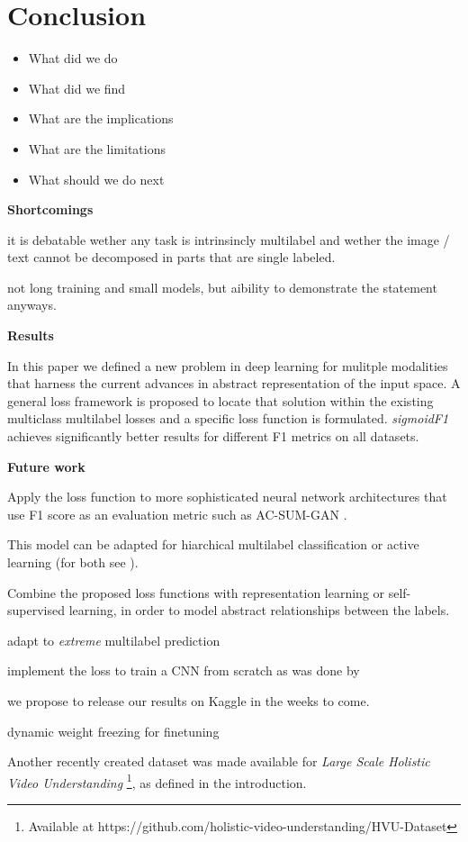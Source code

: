 
\section{Conclusion}
\label{sec:orged3d8a1}
\begin{itemize}[leftmargin=*]
\item What did we do
\item What did we find
\item What are the implications
\item What are the limitations
\item What should we do next
\end{itemize}


\textbf{Shortcomings}

it is debatable wether any task is intrinsincly multilabel and wether the image / text cannot be decomposed in parts that are single labeled.

not long training and small models, but aibility to demonstrate the statement anyways.

\textbf{Results}

In this paper we defined a new problem in deep learning for mulitple modalities that harness the current advances in abstract representation of the input space. A general loss framework is proposed to locate that solution within the existing multiclass multilabel losses and a specific loss function is formulated. \emph{sigmoidF1} achieves significantly better results for different F1 metrics on all datasets.

\textbf{Future work}

Apply the loss function to more sophisticated neural network architectures that use F1 score as an evaluation metric such as AC-SUM-GAN \cite{AC-SUM-GAN}.

This model can be adapted for hiarchical multilabel classification \cite{HARAM} or active learning (for both see \cite{activeLearningMultiLabel}).

Combine the proposed loss functions with representation learning \cite{unsupervisedImage,highResRepresentation} or self-supervised learning, in order to model abstract relationships between the labels.

adapt to \emph{extreme} multilabel prediction \cite{extremeMultilabelText}

implement the loss to train a CNN from scratch as was done by \cite{tencent}

we propose to release our results on Kaggle in the weeks to come.

dynamic weight freezing for finetuning~\cite{ULMFit}

Another recently created dataset was made available for \emph{Large Scale Holistic Video Understanding} \cite{holisticVideoData}\footnote{Available at https://github.com/holistic-video-understanding/HVU-Dataset}, as defined in the introduction.

